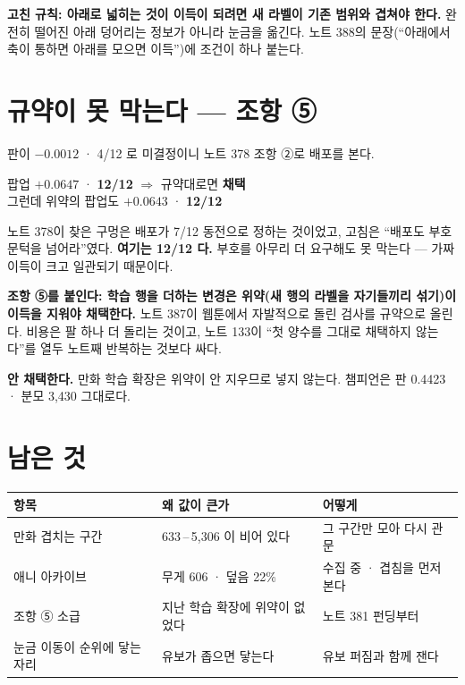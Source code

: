 \documentclass[11pt]{article}
\begin{document}
\textbf{고친 규칙: 아래로 넓히는 것이 이득이 되려면 새 라벨이 기존 범위와
겹쳐야 한다.} 완전히 떨어진 아래 덩어리는 정보가 아니라 눈금을 옮긴다.
노트 388의 문장(``아래에서 축이 통하면 아래를 모으면 이득'')에 조건이
하나 붙는다.

\section{규약이 못 막는다 --- 조항 ⑤}

판이 $-0.0012$ · 4/12 로 미결정이니 노트 378 조항 ②로 배포를 본다.

\begin{center}
팝업 $\mathbf{+0.0647}$ · \textbf{12/12} $\Longrightarrow$ 규약대로면
\textbf{채택} \\
그런데 위약의 팝업도 $\mathbf{+0.0643}$ · \textbf{12/12}
\end{center}

노트 378이 찾은 구멍은 배포가 7/12 동전으로 정하는 것이었고, 고침은
``배포도 부호 문턱을 넘어라''였다. \textbf{여기는 12/12 다.} 부호를 아무리
더 요구해도 못 막는다 --- 가짜 이득이 크고 일관되기 때문이다.

\textbf{조항 ⑤를 붙인다: 학습 행을 더하는 변경은 위약(새 행의 라벨을
자기들끼리 섞기)이 이득을 지워야 채택한다.} 노트 387이 웹툰에서 자발적으로
돌린 검사를 규약으로 올린다. 비용은 팔 하나 더 돌리는 것이고, 노트 133이
``첫 양수를 그대로 채택하지 않는다''를 열두 노트째 반복하는 것보다 싸다.

\textbf{안 채택한다.} 만화 학습 확장은 위약이 안 지우므로 넣지 않는다.
챔피언은 판 0.4423 · 분모 3,430 그대로다.

\section{남은 것}

\begin{center}
\begin{tabular}{lll}
\hline
항목 & 왜 값이 큰가 & 어떻게 \\
\hline
만화 겹치는 구간 & 633\,--\,5,306 이 비어 있다 & 그 구간만 모아 다시 관문 \\
애니 아카이브 & 무게 606 · 덮음 22\% & 수집 중 · 겹침을 먼저 본다 \\
조항 ⑤ 소급 & 지난 학습 확장에 위약이 없었다 & 노트 381 펀딩부터 \\
눈금 이동이 순위에 닿는 자리 & 유보가 좁으면 닿는다 & 유보 퍼짐과 함께 잰다 \\
\hline
\end{tabular}
\end{center}
\end{document}

